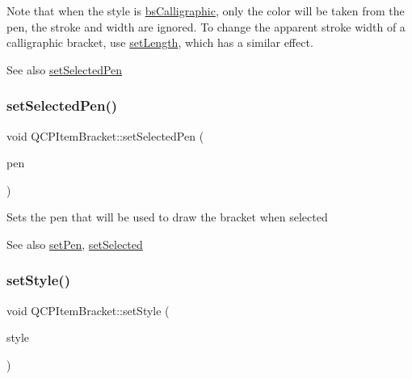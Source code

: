 Note that when the style is \hyperlink{class_q_c_p_item_bracket_a7ac3afd0b24a607054e7212047d59dbda8f29f5ef754e2dc9a9efdedb2face0f3}{bs\+Calligraphic}, only the color will be taken from the pen, the stroke and width are ignored. To change the apparent stroke width of a calligraphic bracket, use \hyperlink{class_q_c_p_item_bracket_ac7cfc3da7da9b5c5ac5dfbe4f0351b2a}{set\+Length}, which has a similar effect.

\begin{DoxySeeAlso}{See also}
\hyperlink{class_q_c_p_item_bracket_a349785c31122778a520c64891fa204c5}{set\+Selected\+Pen} 
\end{DoxySeeAlso}
\mbox{\label{class_q_c_p_item_bracket_a349785c31122778a520c64891fa204c5}} 
\subsubsection{\texorpdfstring{set\+Selected\+Pen()}{setSelectedPen()}}
{\footnotesize\ttfamily void Q\+C\+P\+Item\+Bracket\+::set\+Selected\+Pen (\begin{DoxyParamCaption}\item[{const Q\+Pen \&}]{pen }\end{DoxyParamCaption})}

Sets the pen that will be used to draw the bracket when selected

\begin{DoxySeeAlso}{See also}
\hyperlink{class_q_c_p_item_bracket_ab13001d9cc5d8f9e56ea15bdda682acb}{set\+Pen}, \hyperlink{class_q_c_p_abstract_item_a203de94ad586cc44d16c9565f49d3378}{set\+Selected} 
\end{DoxySeeAlso}
\mbox{\label{class_q_c_p_item_bracket_a612dffa2373422eef8754d690add3703}} 
\subsubsection{\texorpdfstring{set\+Style()}{setStyle()}}
{\footnotesize\ttfamily void Q\+C\+P\+Item\+Bracket\+::set\+Style (\begin{DoxyParamCaption}\item[{\hyperlink{class_q_c_p_item_bracket_a7ac3afd0b24a607054e7212047d59dbd}{Q\+C\+P\+Item\+Bracket\+::\+Bracket\+Style}}]{style }\end{DoxyParamCaption})}

